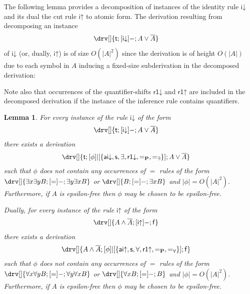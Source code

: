 \documentclass[10pt]{article}
\newtheorem{lemma}[theorem]{Lemma}
\theoremstyle{definition}\newtheorem{remark}[theorem]{Remark}
\theoremstyle{definition}\newtheorem{example}[theorem]{Example}
\theoremstyle{definition}\newtheorem{definition}[theorem]{Definition}
\newcommand{\aiUp}{{\mathsf{ai\mathord\uparrow}}}
\newcommand{\aiDown}{{\mathsf{ai\mathord\downarrow}}}
\newcommand{\iUp}{{\mathsf{i\mathord\uparrow}}}
\newcommand{\iDown}{{\mathsf{i\mathord\downarrow}}}
\newcommand{\switch}{{\mathsf{s}}}
\newcommand{\rOneUp}{{\mathsf{r1\mathord\uparrow}}}
\newcommand{\rOneDown}{{\mathsf{r1\mathord\downarrow}}}
\newcommand{\eqProp}{=_{\textbf{P}}}
\newcommand{\eqExists}{=_{\exists}}
\newcommand{\eqForall}{=_{\forall}}
\newcommand{\trueUnit}{\mathsf{t}}
\newcommand{\falseUnit}{\mathsf{f}}
\begin{document}
	The following lemma provides a decomposition of instances of the identity rule $\iDown$ and its dual the cut rule $\iUp$ to atomic form. The derivation resulting from decomposing an instance
	\[
		\drv[] {
			\trueUnit ; [\iDown]- ; A \lor \overline{A}
		}
	\]
	of $\iDown$ (or, dually, $\iUp$) is of size $O(| A |^2)$ since the derivation is of height $O(| A |)$ due to each symbol in $A$ inducing a fixed-size subderivation in the decomposed derivation:
	\begin{center}
	\end{center}
	Note also that occurrences of the quantifier-shifts $\rOneDown$ and $\rOneUp$ are included in the decomposed derivation if the instance of the inference rule contains quantifiers.
	
	\begin{lemma}\label{IdentityDecomposition}
		For every instance of the rule $\iDown$ of the form
		\[
		\drv[] {
			\trueUnit ; [\iDown]- ; A \lor \overline{A}
		}
		\]
		there exists a derivation
		\[
		\drv[] {
			\trueUnit ; [\phi]|[\{\aiDown, \switch, \exists, \rOneDown, \eqProp, \eqExists\}] ; A \lor \overline{A}
		}
		\]
		such that $\phi$ does not contain any occurrences of $=$ rules of the form $\drv[] {\exists x \exists y B ; [=]- ; \exists y \exists x B}$ or $\drv[] {B ; [=]- ; \exists x B}$ and $| \phi | = O(| A |^2)$. Furthermore, if $A$ is epsilon-free then $\phi$ may be chosen to be epsilon-free.
		
		Dually, for every instance of the rule $\iUp$ of the form
		\[
		\drv[] {
			A \land \overline{A} ; [\iUp]- ; \falseUnit
		}
		\]
		there exists a derivation
		\[
		\drv[] {
			A \land \overline{A} ; [\phi]|[\{\aiUp, \switch, \forall, \rOneUp, \eqProp, \eqForall\}] ; \falseUnit
		}
		\]
		such that $\phi$ does not contain any occurrences of $=$ rules of the form $\drv[] {\forall x \forall y B ; [=]- ; \forall y \forall x B}$ or $\drv[] {\forall x B ; [=]- ; B}$ and $| \phi | = O(| A |^2)$. Furthermore, if $A$ is epsilon-free then $\phi$ may be chosen to be epsilon-free.
	\end{lemma}
	
\end{document}
